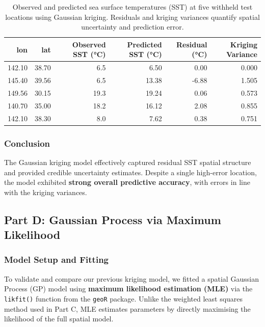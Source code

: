 \documentclass[
  11pt,
]{article}
\begin{document}
\begin{table}

\caption{Observed and predicted sea surface temperatures (SST) at five withheld
test locations using Gaussian kriging. Residuals and kriging variances
quantify spatial uncertainty and prediction error.}
\centering
\begin{tabular}[t]{rrrrrr}
\toprule
lon & lat & Observed SST (°C) & Predicted SST (°C) & Residual (°C) & Kriging Variance\\
\midrule
142.10 & 38.70 & 6.5 & 6.50 & 0.00 & 0.000\\
145.40 & 39.56 & 6.5 & 13.38 & -6.88 & 1.505\\
149.56 & 30.15 & 19.3 & 19.24 & 0.06 & 0.573\\
140.70 & 35.00 & 18.2 & 16.12 & 2.08 & 0.855\\
142.10 & 38.30 & 8.0 & 7.62 & 0.38 & 0.751\\
\bottomrule
\end{tabular}
\end{table}

\subsubsection{\texorpdfstring{\textbf{Conclusion}}{Conclusion}}\label{conclusion}

The Gaussian kriging model effectively captured residual SST spatial
structure and provided credible uncertainty estimates. Despite a single
high-error location, the model exhibited \textbf{strong overall
predictive accuracy}, with errors in line with the kriging variances.

\subsection{Part D: Gaussian Process via Maximum
Likelihood}\label{part-d-gaussian-process-via-maximum-likelihood}

\subsubsection{Model Setup and Fitting}\label{model-setup-and-fitting}

To validate and compare our previous kriging model, we fitted a spatial
Gaussian Process (GP) model using \textbf{maximum likelihood estimation
(MLE)} via the \texttt{likfit()} function from the \texttt{geoR}
package. Unlike the weighted least squares method used in Part C, MLE
estimates parameters by directly maximising the likelihood of the full
spatial model.
\end{document}

